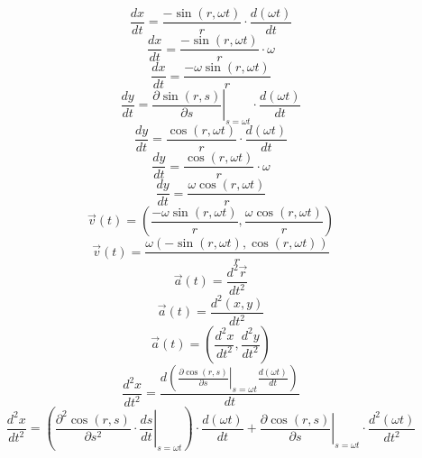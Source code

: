 \documentclass[a4paper,12pt]{report}
\begin{document}
\begin{equation}
\frac{dx}{dt} = \frac{-\sin(r,\omega t)}{r} \cdot \frac{d (\omega t)}{dt}
\end{equation}
\begin{equation}
\frac{dx}{dt} = \frac{-\sin(r,\omega t)}{r} \cdot \omega
\end{equation}
\begin{equation}
\frac{dx}{dt} = \frac{-\omega \sin(r,\omega t)}{r}
\end{equation}
\begin{equation}
\frac{dy}{dt} = \left.\frac{\partial \sin(r,s)}{\partial s}\right|_{s = \omega t} \cdot \frac{d (\omega t)}{dt}
\end{equation}
\begin{equation}
\frac{dy}{dt} = \frac{\cos(r,\omega t)}{r} \cdot \frac{d (\omega t)}{dt}
\end{equation}
\begin{equation}
\frac{dy}{dt} = \frac{\cos(r,\omega t)}{r} \cdot \omega
\end{equation}
\begin{equation}
\frac{dy}{dt} = \frac{\omega \cos(r,\omega t)}{r}
\end{equation}
\begin{equation}
\vec{v}(t) = \left(\frac{-\omega \sin(r,\omega t)}{r},\frac{\omega \cos(r,\omega t)}{r}\right)
\end{equation}
\begin{equation}
\vec{v}(t) = \frac{\omega (-\sin(r,\omega t),\cos(r,\omega t))}{r}
\end{equation}
\begin{equation}
\vec{a}(t) = \frac{d^2 \vec{r}}{dt^2}
\end{equation}
\begin{equation}
\vec{a}(t) = \frac{d^2 (x,y)}{dt^2}
\end{equation}
\begin{equation}
\vec{a}(t) = \left(\frac{d^2x}{dt^2},\frac{d^2y}{dt^2}\right)
\end{equation}
\begin{equation}
\frac{d^2x}{dt^2} = \frac{d \left(\left.\frac{\partial \cos(r,s)}{\partial s}\right|_{s = \omega t} \frac{d (\omega t)}{dt}\right)}{dt}
\end{equation}
\begin{equation}
\frac{d^2x}{dt^2} = \left(\left.\frac{\partial^2 \cos(r,s)}{\partial s^2} \cdot \frac{ds}{dt}\right|_{s = \omega t}\right) \cdot \frac{d (\omega t)}{dt} + \left.\frac{\partial \cos(r,s)}{\partial s}\right|_{s = \omega t} \cdot \frac{d^2 (\omega t)}{dt^2}
\end{equation}
\end{document}
